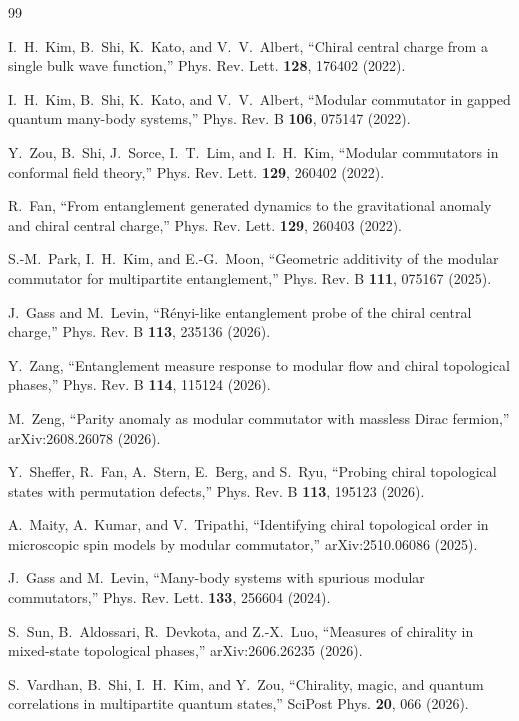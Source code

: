 \documentclass[aps,prb,preprint,nofootinbib,longbibliography]{revtex4-2}
\begin{document}
\begin{thebibliography}{99}

I.~H.~Kim, B.~Shi, K.~Kato, and V.~V.~Albert,
``Chiral central charge from a single bulk wave function,''
Phys. Rev. Lett. \textbf{128}, 176402 (2022).

I.~H.~Kim, B.~Shi, K.~Kato, and V.~V.~Albert,
``Modular commutator in gapped quantum many-body systems,''
Phys. Rev. B \textbf{106}, 075147 (2022).

Y.~Zou, B.~Shi, J.~Sorce, I.~T.~Lim, and I.~H.~Kim,
``Modular commutators in conformal field theory,''
Phys. Rev. Lett. \textbf{129}, 260402 (2022).

R.~Fan,
``From entanglement generated dynamics to the gravitational anomaly and
chiral central charge,''
Phys. Rev. Lett. \textbf{129}, 260403 (2022).

S.-M.~Park, I.~H.~Kim, and E.-G.~Moon,
``Geometric additivity of the modular commutator for multipartite
entanglement,''
Phys. Rev. B \textbf{111}, 075167 (2025).

J.~Gass and M.~Levin,
``R\'enyi-like entanglement probe of the chiral central charge,''
Phys. Rev. B \textbf{113}, 235136 (2026).

Y.~Zang,
``Entanglement measure response to modular flow and chiral topological
phases,''
Phys. Rev. B \textbf{114}, 115124 (2026).

M.~Zeng,
``Parity anomaly as modular commutator with massless Dirac fermion,''
arXiv:2608.26078 (2026).

Y.~Sheffer, R.~Fan, A.~Stern, E.~Berg, and S.~Ryu,
``Probing chiral topological states with permutation defects,''
Phys. Rev. B \textbf{113}, 195123 (2026).

A.~Maity, A.~Kumar, and V.~Tripathi,
``Identifying chiral topological order in microscopic spin models by modular
commutator,''
arXiv:2510.06086 (2025).

J.~Gass and M.~Levin,
``Many-body systems with spurious modular commutators,''
Phys. Rev. Lett. \textbf{133}, 256604 (2024).

S.~Sun, B.~Aldossari, R.~Devkota, and Z.-X.~Luo,
``Measures of chirality in mixed-state topological phases,''
arXiv:2606.26235 (2026).

S.~Vardhan, B.~Shi, I.~H.~Kim, and Y.~Zou,
``Chirality, magic, and quantum correlations in multipartite quantum
states,''
SciPost Phys. \textbf{20}, 066 (2026).


\end{thebibliography}
\end{document}
